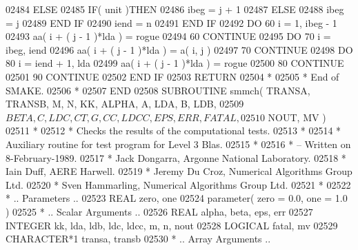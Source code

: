 \begin{DoxyCode}
02484             \textcolor{keywordflow}{ELSE}
02485                \textcolor{keywordflow}{IF}( unit )\textcolor{keywordflow}{THEN}
02486                   ibeg = j + 1
02487                \textcolor{keywordflow}{ELSE}
02488                   ibeg = j
02489 \textcolor{keywordflow}{               END IF}
02490                iend = n
02491 \textcolor{keywordflow}{            END IF}
02492             \textcolor{keywordflow}{DO} 60 i = 1, ibeg - 1
02493                aa( i + ( j - 1 )*lda ) = rogue
02494    60       \textcolor{keywordflow}{CONTINUE}
02495             \textcolor{keywordflow}{DO} 70 i = ibeg, iend
02496                aa( i + ( j - 1 )*lda ) = a( i, j )
02497    70       \textcolor{keywordflow}{CONTINUE}
02498             \textcolor{keywordflow}{DO} 80 i = iend + 1, lda
02499                aa( i + ( j - 1 )*lda ) = rogue
02500    80       \textcolor{keywordflow}{CONTINUE}
02501    90    \textcolor{keywordflow}{CONTINUE}
02502 \textcolor{keywordflow}{      END IF}
02503       \textcolor{keywordflow}{RETURN}
02504 \textcolor{comment}{*}
02505 \textcolor{comment}{*     End of SMAKE.}
02506 \textcolor{comment}{*}
02507 \textcolor{keyword}{      END}
02508 \textcolor{keyword}{      SUBROUTINE }smmch( TRANSA, TRANSB, M, N, KK, ALPHA, A, LDA, B, LDB,
02509      $                  BETA, C, LDC, CT, G, CC, LDCC, EPS, ERR, FATAL,
02510      $                  NOUT, MV )
02511 \textcolor{comment}{*}
02512 \textcolor{comment}{*  Checks the results of the computational tests.}
02513 \textcolor{comment}{*}
02514 \textcolor{comment}{*  Auxiliary routine for test program for Level 3 Blas.}
02515 \textcolor{comment}{*}
02516 \textcolor{comment}{*  -- Written on 8-February-1989.}
02517 \textcolor{comment}{*     Jack Dongarra, Argonne National Laboratory.}
02518 \textcolor{comment}{*     Iain Duff, AERE Harwell.}
02519 \textcolor{comment}{*     Jeremy Du Croz, Numerical Algorithms Group Ltd.}
02520 \textcolor{comment}{*     Sven Hammarling, Numerical Algorithms Group Ltd.}
02521 \textcolor{comment}{*}
02522 \textcolor{comment}{*     .. Parameters ..}
02523       \textcolor{keywordtype}{REAL}               zero, one
02524       parameter( zero = 0.0, one = 1.0 )
02525 \textcolor{comment}{*     .. Scalar Arguments ..}
02526       \textcolor{keywordtype}{REAL}               alpha, beta, eps, err
02527       \textcolor{keywordtype}{INTEGER}            kk, lda, ldb, ldc, ldcc, m, n, nout
02528       \textcolor{keywordtype}{LOGICAL}            fatal, mv
02529       \textcolor{keywordtype}{CHARACTER*1}        transa, transb
02530 \textcolor{comment}{*     .. Array Arguments ..}

\end{DoxyCode}

